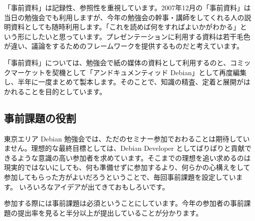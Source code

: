 \documentclass[mingoth,a4paper]{jsarticle}
\begin{document}
「事前資料」は記録性、参照性を重視しています。2007年12月の「事前資料」は
当日の勉強会でも利用しますが、今年の勉強会の幹事・講師をしてくれる人の説
明資料としても随時利用します。「これを読めば何をすればよいかがわかる」と
いう形にしたいと思っています。プレゼンテーションに利用する資料は若干毛色
が違い、議論をするためのフレームワークを提供するものだと考えています。

「事前資料」については、勉強会で紙の媒体の資料として利用するのと、コミッ
クマーケットを契機として「アンドキュメンティッド Debian」として再度編集
し、半年に一度まとめて製本します。そのことで、知識の精査、定着と展開がは
かれることを目的としています。

\subsection{事前課題の役割}

東京エリア Debian 勉強会では、ただのセミナー参加でおわることは期待してい
ません。理想的な最終目標としては、Debian Developer としてばりばりと貢献で
きるような意識の高い参加者を求めています。そこまでの理想を追い求めるのは
現実的ではないにしても、何も準備せずに参加するより、何らかの心構えをして
参加してもらった方がよいだろうということで、毎回事前課題を設定しています。
いろいろなアイデアが出てきておもしろいです。

参加する際には事前課題は必須ということにしています。今年の参加者の事前課
題の提出率を見ると半分以上が提出していることが分かります。
\end{document}
